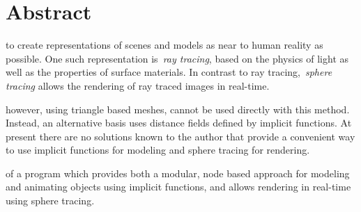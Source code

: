 \documentclass[%
    a4paper,    %
    justified,  %
    nobib,      %
    openany     %
]{tufte-book}
\makeatletter
\renewcommand{\label}[1]{\@tufte@label{##1}}%
\makeatother
\begin{document}
\chapter*{Abstract}
\label{chap:abstract}


 to create representations of
scenes and models as near to human reality as possible. One such representation
is~\emph{ray tracing}, based on the physics of light as well as the properties
of surface materials. In contrast to ray tracing,~\emph{sphere tracing} allows
the rendering of ray traced images in real-time.

 however, using triangle
based meshes, cannot be used directly with this method. Instead, an alternative
basis uses distance fields defined by implicit functions. At present there are
no solutions known to the author that provide a convenient way to use implicit
functions for modeling and sphere tracing for rendering.

 of a program which
provides both a modular, node based approach for modeling and animating objects
using implicit functions, and allows rendering in real-time using sphere
tracing.
\end{document}

